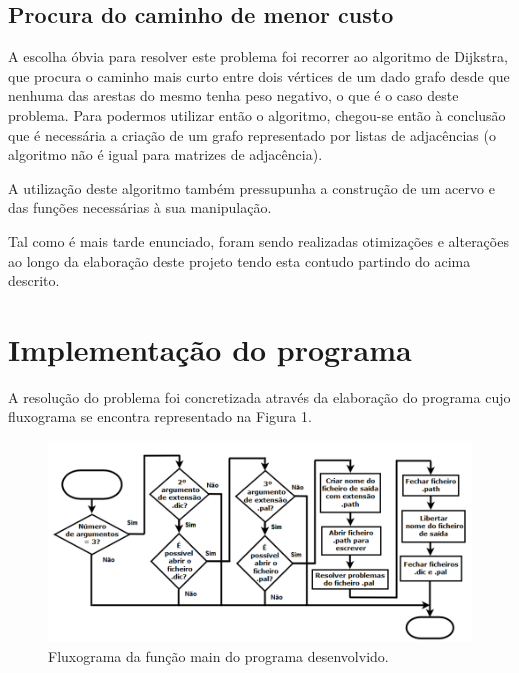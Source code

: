 \documentclass[a4paper, 11pt]{article}
\begin{document}
\subsection{Procura do caminho de menor custo}
    \par A escolha óbvia para resolver este problema foi recorrer ao algoritmo de Dijkstra, que procura o caminho mais curto entre dois vértices de um dado grafo desde que nenhuma das arestas do mesmo tenha peso negativo, o que é o caso deste problema. Para podermos utilizar então o algoritmo, chegou-se então à conclusão que é necessária a criação de um grafo representado por listas de adjacências (o algoritmo não é igual para matrizes de adjacência).
    \par A utilização deste algoritmo também pressupunha a construção de um acervo e das funções necessárias à sua manipulação. 
    \par Tal como é mais tarde enunciado, foram sendo realizadas otimizações e alterações ao longo da elaboração deste projeto tendo esta contudo partindo do acima descrito.
      
    
\section{Implementação do programa}
    \par A resolução do problema foi concretizada através da elaboração do programa cujo fluxograma se encontra representado na Figura 1.

  \begin{figure}
        \includegraphics[width=\linewidth]{main.png}
        \caption{Fluxograma da função main do programa desenvolvido.}
        \label{fig:flux1}
    \end{figure}
    
\end{document}
